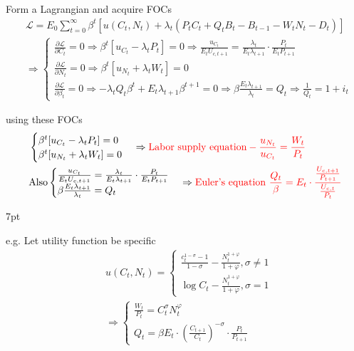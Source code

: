 \documentclass{article}
\newenvironment{greenblock}{%
\def\FrameCommand{%
  \hspace{1pt}%
    {\color{Green}%
    \vrule width 2pt}%
    {\color{greenshade}%
    \vrule width 4pt}%
  \colorbox{greenshade}%
}%
\MakeFramed{%
  \advance%
  \hsize-%
  \width%
  \FrameRestore}%
\noindent\hspace{-4.55pt}%
\begin{adjustwidth}{}{7pt}%
\vspace{2pt}\vspace{2pt}%
}
{%
\vspace{2pt}\end{adjustwidth}\endMakeFramed%
}
\begin{document}
Form a Lagrangian and acquire FOCs
\begin{align}
&\mathscr{L}=E_{0} \sum\limits_{t=0}^{\infty}\beta^{t}[u(C_{t},N_{t})+\lambda_{t}(P_{t}C_{t}+Q_{t}B_{t}-B_{t-1}-W_{t}N_{t}-D_{t} )]
\\&
\Rightarrow 
\begin{cases}\frac{\partial  \mathscr{L}}{\partial C_{t}}=0 \Rightarrow \beta^{t}[u_{C_{t}} -\lambda_{t}P_{t}]=0 \Rightarrow \frac{u_{C_{t}}}{E_{t}U_{c,t+1}}=\frac{\lambda_{t}}{E_{t}\lambda_{t+1}} \cdot \frac{P_{t}}{E_{t}{P_{t+1}}} \\
\frac{\partial  \mathscr{L}}{\partial N_{t}}=0 \Rightarrow \beta^{t}[u_{N_{t}}+\lambda_{t} W_{t}] =0 \\
\frac{\partial  \mathscr{L}}{\partial \beta_{t}}=0 \Rightarrow -\lambda_{t}Q_{t}\beta^{t}+E_{t}\lambda_{t+1}\beta^{t+1}=0 \Rightarrow \beta \frac{E_{t}\lambda_{t+1}}{\lambda_{t}}=Q_{t} \Rightarrow \frac{1}{Q_{t}}=1+i_{t} 
\end{cases}
\end{align}

using these FOCs 
\begin{align}
&\begin{cases}
  \beta^{t}[u_{C_{t}} -\lambda_{t}P_{t}]=0 \\
  \beta^{t}[u_{N_{t}}+\lambda_{t} W_{t}] =0
\end{cases} \Rightarrow \color{red} \text{Labor supply equation} -\frac{u_{N_{t}}}{u_{C_{t}}}=\frac{W_{t}}{P_{t}}
\\&
\text{Also} \begin{cases}\frac{u_{C_{t}}}{E_{t}U_{c,t+1}}=\frac{\lambda_{t}}{E_{t}\lambda_{t+1}} \cdot \frac{P_{t}}{E_{t}{P_{t+1}}} \\
\beta \frac{E_{t}\lambda_{t+1}}{\lambda_{t}}=Q_{t}
\end{cases} 
\Rightarrow \color{red} \text{Euler's equation } \frac{Q_{t}}{\beta}=E_{t}\cdot 
\frac{\frac{U_{c,t+1}}{P_{t+1}}}{\frac{U_{c,t}}{P_{t}}}
\end{align}


\begin{greenblock}
e.g. Let utility function be specific
\begin{align}
&
u(C_{t},N_{t})=\begin{cases}
\frac{c^{1-\sigma}_{t}-1}{1-\sigma}-\frac{N_{t}^{1+\varphi}}{1+\varphi},\sigma\neq 1 \\
\log C_{t}-\frac{N_{t}^{1+\varphi}}{1+\varphi},\sigma=1\end{cases}
\\&
\Rightarrow \begin{cases}
\frac{W_{t}}{P_{t}}=C_{t}^{\sigma}N_{t}^{\varphi} \\
Q_{t}=\beta E_{t}\cdot (\frac{C_{t+1}}{C_{t}})^{-\sigma}\cdot \frac{P_{t}}{P_{t+1}}
\end{cases}
\end{align}
\end{greenblock}
\end{document}
